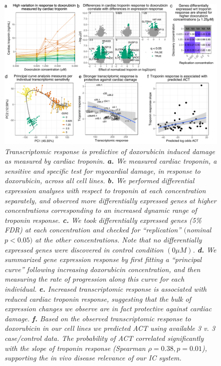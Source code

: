 \documentclass{article}
\begin{document}
{\begin{figure}
\begin{center}
    \includegraphics[width=1\textwidth]{../figures/fig4_troponin.pdf}     \caption{\it{Transcriptomic response is predictive of doxorubicin induced damage as measured by cardiac troponin. \textbf{a.} We measured cardiac troponin, a sensitive and specific test for myocardial damage, in response to doxorubicin, across all cell lines. \textbf{b.} We performed differential expression analyses with respect to troponin at each concentration separately, and observed more differentially expressed genes at higher concentrations corresponding to an increased dynamic range of troponin response. \textbf{c.} We took differentially expressed genes (5\% FDR) at each concentration and checked for ``replication'' $($nominal $p<0.05)$ at the other concentrations. Note that no differentially expressed genes were discovered in control condition $(0 \mu M)$. \textbf{d.} We summarized gene expression response by first fitting a ``principal curve'' following increasing doxorubicin concentration, and then measuring the rate of progression along this curve for each individual. \textbf{e.} Increased transcriptomic response is associated with reduced cardiac troponin response, suggesting that the bulk of expression changes we observe are in fact protective against cardiac damage. \textbf{f.} Based on the observed transcriptomic response to doxorubicin in our cell lines we predicted ACT using available 3 v. 3 case/control data\cite{Burridge2016}. The probability of ACT correlated significantly with the slope of troponin response (Spearman $\rho=0.38, p=0.01$), supporting the \emph{in vivo} disease relevance of our IC system. }}
    \label{fig_troponin}
    \end{center}
\end{figure}

}
\end{document}
